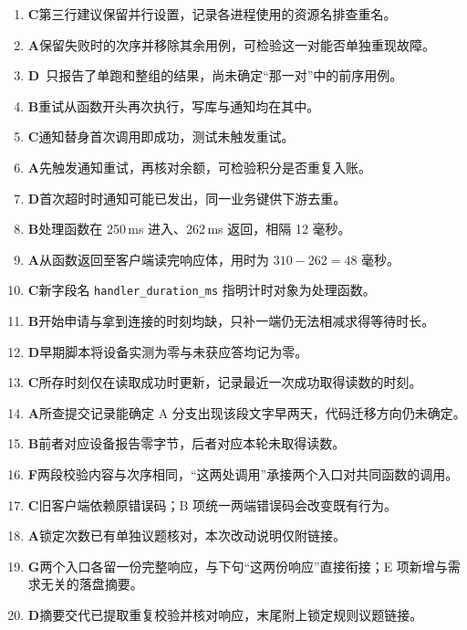 \documentclass[UTF8, zihao=5, a4paper, fontset=fandol]{ctexart}
\begin{document}
\begin{enumerate}[label=\textbf{\arabic*.}, start=11, leftmargin=2.2em, itemsep=2pt, topsep=3pt]
  \item \textbf{C}\quad 第三行建议保留并行设置，记录各进程使用的资源名排查重名。
  \item \textbf{A}\quad 保留失败时的次序并移除其余用例，可检验这一对能否单独重现故障。
  \item \textbf{D}\quad \utag~只报告了单跑和整组的结果，尚未确定“那一对”中的前序用例。
  \item \textbf{B}\quad 重试从函数开头再次执行，写库与通知均在其中。
  \item \textbf{C}\quad 通知替身首次调用即成功，测试未触发重试。
  \item \textbf{A}\quad 先触发通知重试，再核对余额，可检验积分是否重复入账。
  \item \textbf{D}\quad 首次超时时通知可能已发出，同一业务键供下游去重。
  \item \textbf{B}\quad 处理函数在 250\,ms 进入、262\,ms 返回，相隔 12 毫秒。
  \item \textbf{A}\quad 从函数返回至客户端读完响应体，用时为 $310 - 262 = 48$ 毫秒。
  \item \textbf{C}\quad 新字段名 \texttt{handler\_duration\_ms} 指明计时对象为处理函数。
  \item \textbf{B}\quad 开始申请与拿到连接的时刻均缺，只补一端仍无法相减求得等待时长。
  \item \textbf{D}\quad 早期脚本将设备实测为零与未获应答均记为零。
  \item \textbf{C}\quad 所存时刻仅在读取成功时更新，记录最近一次成功取得读数的时刻。
  \item \textbf{A}\quad 所查提交记录能确定 A 分支出现该段文字早两天，代码迁移方向仍未确定。
  \item \textbf{B}\quad 前者对应设备报告零字节，后者对应本轮未取得读数。
  \item \textbf{F}\quad 两段校验内容与次序相同，“这两处调用”承接两个入口对共同函数的调用。
  \item \textbf{C}\quad 旧客户端依赖原错误码；B 项统一两端错误码会改变既有行为。
  \item \textbf{A}\quad 锁定次数已有单独议题核对，本次改动说明仅附链接。
  \item \textbf{G}\quad 两个入口各留一份完整响应，与下句“这两份响应”直接衔接；E 项新增与需求无关的落盘摘要。
  \item \textbf{D}\quad 摘要交代已提取重复校验并核对响应，末尾附上锁定规则议题链接。
\end{enumerate}
\end{document}
